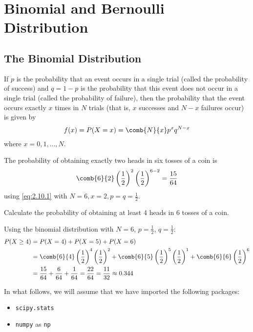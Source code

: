 \section{Binomial and Bernoulli Distribution}

\subsection{The Binomial Distribution}

If $p$ is the probability that an event occurs in a single trial (called the probability of success) and $q = 1 - p$ is the probability that this event does not occur in a single trial (called the probability of failure), then the probability that the event occurs exactly $x$ times in $N$ trials (that is, $x$ successes and $N - x$ failures occur) is given by
\begin{align}
 \label{eq:2.10.1}
 f(x)=P(X=x)=\comb{N}{x}p^{x}q^{N-x}
\end{align}
where $x=0,1,...,N.$

\begin{ejemplo}
  \label{exmp:2.10.1}
  The probability of obtaining exactly two heads in six tosses of a coin is
  \begin{align}
   \comb{6}{2}\left( \dfrac{1}{2} \right)^{2}\left( \dfrac{1}{2} \right)^{6-2}=\dfrac{15}{64}
  \end{align}
  using \eqref{eq:2.10.1} with $N=6, x=2, p=q=\frac{1}{2}.$
\end{ejemplo}

\begin{ejemplo}
 \label{exmp:2.10.2}
 Calculate the probability of obtaining at least 4 heads in 6 tosses of a coin.
\end{ejemplo}

\begin{solucion}
	Using the binomial distribution with $N=6$, $p=\frac{1}{2}$, $q=\frac{1}{2}$:
	\begin{align}
		P(X \geq 4) &= P(X=4) + P(X=5) + P(X=6) \\
		&= \comb{6}{4}\left(\frac{1}{2}\right)^4\left(\frac{1}{2}\right)^2 + \comb{6}{5}\left(\frac{1}{2}\right)^5\left(\frac{1}{2}\right)^1 + \comb{6}{6}\left(\frac{1}{2}\right)^6 \\
		&= \frac{15}{64} + \frac{6}{64} + \frac{1}{64} = \frac{22}{64} = \frac{11}{32} \approx 0.344
	\end{align}
\end{solucion}

In what follows, we will assume that we have imported the following packages:
\begin{itemize}
 \item \texttt{scipy.stats}
 \item \texttt{numpy} as \texttt{np}
\end{itemize}


